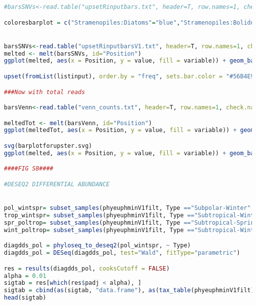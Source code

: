 \documentclass{article}
\begin{document}
\begin{lstlisting}[language=R,caption={N1N2figscripts}]
#barsSNVs<-read.table("upsetRinputbars.txt", header=T, row.names=1, check.names=F)#OLD

coloresbarplot = c("Stramenopiles:Diatoms"="blue","Stramenopiles:Bolidophyceae"="cadetblue","Stramenopiles:Dictyochophyceae"="lightskyblue","Stramenopiles:Pelagophyceae"="aquamarine","Stramenopiles:Chrysophyceae"="turquoise","Prymnesiophyceae"="darkgoldenrod3","Rappemonad"="gold2","Cryptophyceae"="coral3","Prasinophyta"="forestgreen","Eusiphoniidae"="lemonchiffon3","Cyanobacteria"="purple","Unassigned"="cornsilk4", Alveolata="rosybrown3", Rhodophyta="tan1")


barsSNVs<-read.table("upsetRinputbarsV1.txt", header=T, row.names=1, check.names=F)#NEW
melted <- melt(barsSNVs, id="Position")
ggplot(melted, aes(x = Position, y = value, fill = variable)) + geom_bar(stat = "identity",width=.5) + theme_bw()+ scale_fill_manual(values = coloresbarplot)

upset(fromList(listinput), order.by = "freq", sets.bar.color = "#56B4E9")

###Now with total reads

barsVenn<-read.table("venn_counts.txt", header=T, row.names=1, check.names=F)

meltedTot <- melt(barsVenn, id="Position")
ggplot(meltedTot, aes(x = Position, y = value, fill = variable)) + geom_bar(stat = "identity",width=.5) + theme_bw()

svg(barplotforupster.svg)
ggplot(melted, aes(x = Position, y = value, fill = variable)) + geom_bar(stat = "identity",width=.5) + theme_bw()+ scale_fill_manual(values = coloresbarplot)

####FIG S8####

#DESEQ2 DIFFERENTIAL ABUNDANCE


pol_wintspr= subset_samples(phyeuphminV1filt, Type =="Subpolar-Winter" | Type=="Subpolar-Spring")
trop_wintspr= subset_samples(phyeuphminV1filt, Type =="Subtropical-Winter" | Type=="Subtropical-Spring")
spr_poltrop= subset_samples(phyeuphminV1filt, Type =="Subtropical-Spring" | Type=="Subpolar-Spring")
wint_poltrop= subset_samples(phyeuphminV1filt, Type =="Subtropical-Winter" | Type=="Subpolar-Winter")

diagdds_pol = phyloseq_to_deseq2(pol_wintspr, ~ Type)
diagdds_pol = DESeq(diagdds_pol, test="Wald", fitType="parametric")

res = results(diagdds_pol, cooksCutoff = FALSE)
alpha = 0.01
sigtab = res[which(res$padj < alpha), ]
sigtab = cbind(as(sigtab, "data.frame"), as(tax_table(phyeuphminV1filt)[rownames(sigtab), ], "matrix"))
head(sigtab)


\end{lstlisting}
\end{document}
